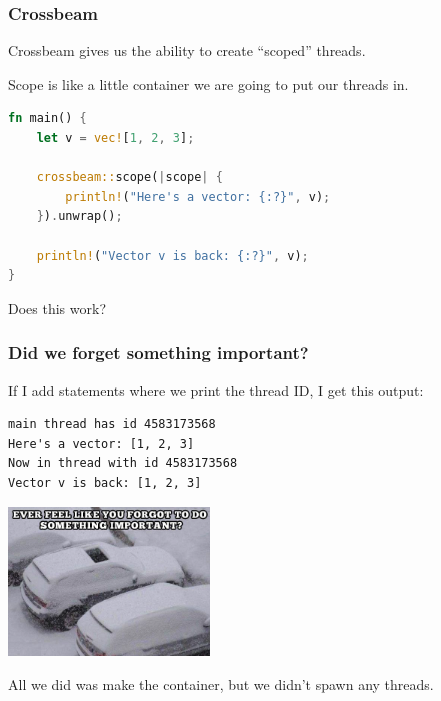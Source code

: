 \begin{frame}[fragile]
\frametitle{Crossbeam}

 Crossbeam gives us the ability to create ``scoped'' threads. 
 
 Scope is like a little container we are going to put our threads in.
 
\begin{lstlisting}[language=Rust]
fn main() {
    let v = vec![1, 2, 3];

    crossbeam::scope(|scope| {
        println!("Here's a vector: {:?}", v);
    }).unwrap();

    println!("Vector v is back: {:?}", v);
}
\end{lstlisting}

Does this work?

\end{frame}


\begin{frame}[fragile]
\frametitle{Did we forget something important?}

If I add statements where we print the thread ID, I get this output:

{\scriptsize 
\begin{verbatim}
main thread has id 4583173568
Here's a vector: [1, 2, 3]
Now in thread with id 4583173568
Vector v is back: [1, 2, 3]
\end{verbatim}
}

\begin{center}
	\includegraphics[width=0.4\textwidth]{images/forgotsomething.png}
\end{center}

All we did was make the container, but we didn't spawn any threads.


\end{frame}

